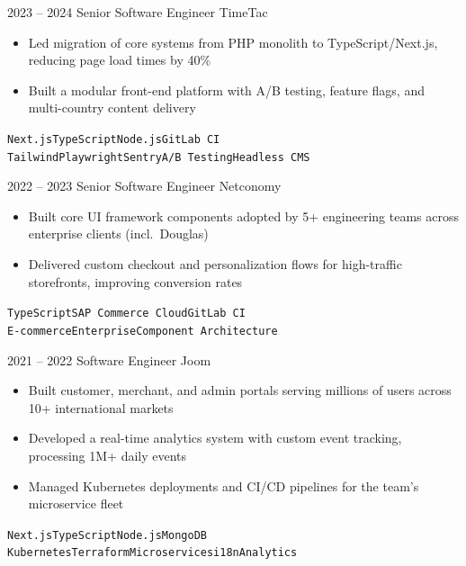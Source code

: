 \documentclass[2pt]{template}
\begin{document}
\begin{entrylist}
    \entry
    {2023 -- 2024}
    {Senior Software Engineer}
    {TimeTac}
    {
        \begin{itemize}[noitemsep,topsep=5pt,leftmargin=8pt]
            \item Led migration of core systems from PHP monolith to TypeScript/Next.js, reducing page load times by 40\%
            \item Built a modular front-end platform with A/B testing, feature flags, and multi-country content delivery
        \end{itemize}
        \texttt{Next.js}\slashsep\texttt{TypeScript}\slashsep\texttt{Node.js}\slashsep\texttt{GitLab CI}\\
        {\color{gray}\texttt{Tailwind}\slashsep\texttt{Playwright}\slashsep\texttt{Sentry}\slashsep\texttt{A/B Testing}\slashsep\texttt{Headless CMS}}}

    \entry
    {2022 -- 2023}
    {Senior Software Engineer}
    {Netconomy}
    {
        \begin{itemize}[noitemsep,topsep=5pt,leftmargin=8pt]
            \item Built core UI framework components adopted by 5+ engineering teams across enterprise clients (incl.\ Douglas)
            \item Delivered custom checkout and personalization flows for high-traffic storefronts, improving conversion rates
        \end{itemize}
        \texttt{TypeScript}\slashsep\texttt{SAP Commerce Cloud}\slashsep\texttt{GitLab CI}\\
        {\color{gray}\texttt{E-commerce}\slashsep\texttt{Enterprise}\slashsep\texttt{Component Architecture}}}

    \entry
    {2021 -- 2022}
    {Software Engineer}
    {Joom}
    {
        \begin{itemize}[noitemsep,topsep=5pt,leftmargin=8pt]
            \item Built customer, merchant, and admin portals serving millions of users across 10+ international markets
            \item Developed a real-time analytics system with custom event tracking, processing 1M+ daily events
            \item Managed Kubernetes deployments and CI/CD pipelines for the team's microservice fleet
        \end{itemize}
        \texttt{Next.js}\slashsep\texttt{TypeScript}\slashsep\texttt{Node.js}\slashsep\texttt{MongoDB}\\
        {\color{gray}\texttt{Kubernetes}\slashsep\texttt{Terraform}\slashsep\texttt{Microservices}\slashsep\texttt{i18n}\slashsep\texttt{Analytics}}}


\end{entrylist}
\end{document}
